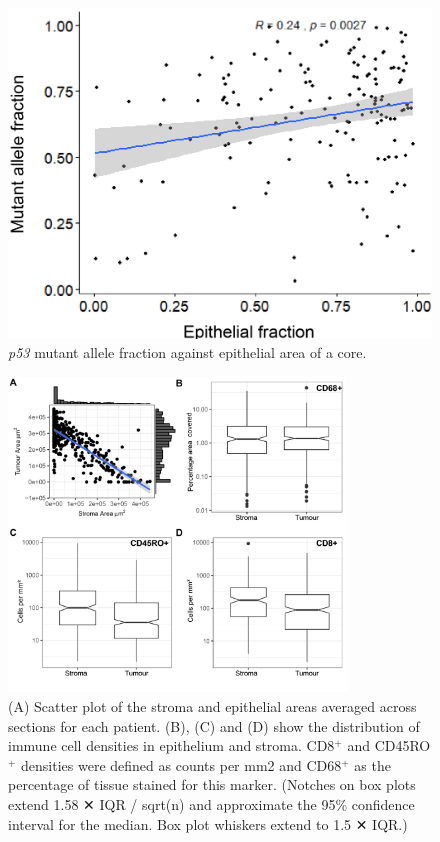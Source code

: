 \begin{figure}
    \centering
    \includegraphics{Chapter2/Figs/Raster/Thesis-05.png}
    \caption{\textit{p53} mutant allele fraction against epithelial area of a core.}
    \label{fig:p53_allele}
\end{figure}

\begin{figure}
    \centering
    \includegraphics[width=0.8\textwidth]{Chapter2/Figs/Raster/plots_dist.png}
    \caption[Distribution of immune densities.]{ (A) Scatter plot of the stroma and epithelial  areas averaged across sections for each patient. (B), (C) and (D) show the distribution of immune cell densities in epithelium and stroma. CD8$^+$ and CD45RO$^+$ densities were defined as counts per mm2 and CD68$^+$ as the percentage of tissue stained for this marker. (Notches on box plots extend 1.58 ✕ IQR / sqrt(n) and approximate the 95\% confidence interval for the median. Box plot whiskers extend to 1.5 ✕ IQR.) 
}
    \label{fig:distribution_infiltrate}
\end{figure}


